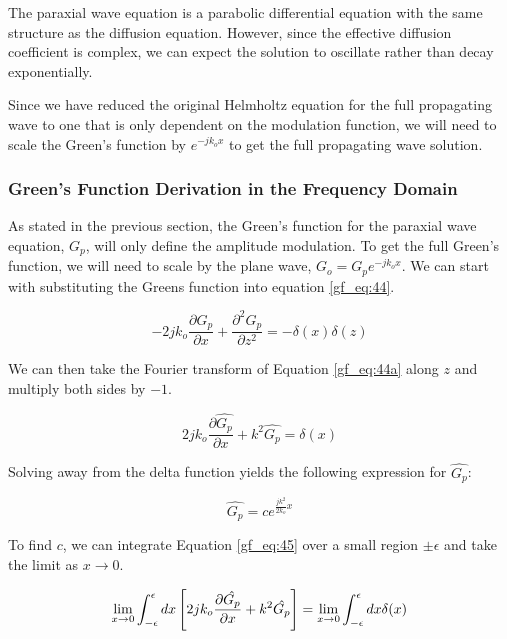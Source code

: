 The paraxial wave equation is a parabolic differential equation with the same structure as the diffusion equation. However, since the effective diffusion coefficient is complex, we can expect the solution to oscillate rather than decay exponentially.

Since we have reduced the original Helmholtz equation for the full propagating wave to one that is only dependent on the modulation function, we will need to scale the Green's function by $e^{-jk_ox}$ to get the full propagating wave solution.
 
\subsubsection {Green's Function Derivation in the Frequency Domain}
As stated in the previous section, the Green's function for the paraxial wave equation, $G_p$, will only define the amplitude modulation. To get the full Green's function, we will need to scale by the plane wave, $G_o= G_p e^{-jk_ox}$. We can start with substituting the Greens function into equation \ref{gf_eq:44}.

\begin{equation}
-2jk_o\frac{\partial G_p}{\partial x} + \frac{\partial^2 G_p}{\partial z^2} = -\delta(x)\delta(z)
\label{gf_eq:44a}
\end{equation}
 \renewcommand{\baselinestretch}{2} \small\normalsize
 
We can then take the Fourier transform of Equation \ref{gf_eq:44a} along $z$ and multiply both sides by $-1$.

\begin{equation}
2jk_o\frac{\partial \hat{G_p}}{\partial x} +k^2\hat{G_p} = \delta(x)
\label{gf_eq:45}
\end{equation}
 \renewcommand{\baselinestretch}{2} \small\normalsize
 
Solving away from the delta function yields the following expression for $\hat{G_p}$:

\begin{equation}
\hat{G_p}= ce^{\frac{jk^2}{2k_o}x}
\label{gf_eq:46}
\end{equation}
 \renewcommand{\baselinestretch}{2} \small\normalsize
 
To find $c$, we can integrate Equation \ref{gf_eq:45} over a small region $\pm\epsilon$ and take the limit as $x\rightarrow 0$.

\begin{equation}
\lim_{x\rightarrow 0}\int_{-\epsilon}^{\epsilon}dx\left[2jk_o\frac{\partial\hat{G_p}}{\partial x}+ k^2\hat{G_p} \right] = \lim_{x\rightarrow 0}\int_{-\epsilon}^{\epsilon}dx\delta(x)\\
\label{gf_eq:47}
\end{equation}
 \renewcommand{\baselinestretch}{2} \small\normalsize
 

